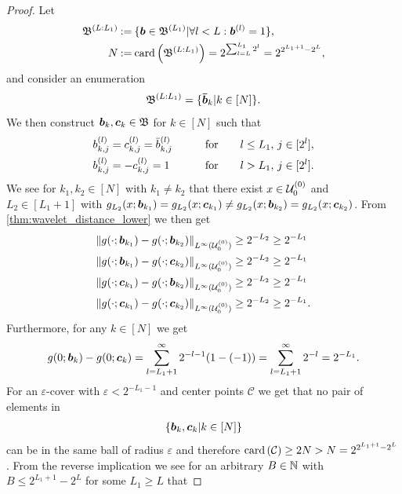 \documentclass[10pt,a4paper]{amsart}
\newcommand{\defeq}{\mathbin{:=}}
\newcommand{\set}[1]{\ensuremath{\mathcal{#1}}}
\begin{document}
\begin{proof}
Let
\begin{align}
    \CoeffSpace[L:L_1]
    &\defeq
    \{\coeff\in\CoeffSpace[L_1]|\forall l<L:\coeff[l]=1\},
    \\
    N
    &\defeq
    \card{\CoeffSpace[L:L_1]}=2^{\sum_{l=L}^{L_1}2^l}=2^{2^{L_1+1}-2^L},
\end{align}
and consider an enumeration
\begin{align}
    \CoeffSpace[L:L_1]=\{\coeff*_k|k\in[N]\}.
\end{align}
We then construct $\coeff_k,\coeffC_k\in\CoeffSpace$ for $k\in[N]$ such that
\begin{alignat}{2}
    \coeff[l][k,j]&=\coeffC[l][k,j]=\coeff*[l][k,j]&\qquad&\text{for}\qquad l\leq L_1,\, j\in[2^l],\\
    \coeff[l][k,j]&=-\coeffC[l][k,j]=1&&\text{for}\qquad l>L_1,\,j\in[2^l].
\end{alignat}
We see for $k_1,k_2\in[N]$ with $k_1\neq k_2$ that there exist $x\in\dyadicU{0}{0}$ and $L_2\in[L_1+1]$ with $g_{L_2}(x;\coeff_{k_1})=g_{L_2}(x;\coeffC_{k_1})\neq g_{L_2}(x;\coeff_{k_2})=g_{L_2}(x;\coeffC_{k_2})$.
From \cref{thm:wavelet_distance_lower} we then get
\begin{align}
    \norm{g(\cdot;\coeff_{k_1})-g(\cdot;\coeff_{k_2})}[L^\infty(\dyadicU{0}{0})]
    &\geq 2^{-L_2}\geq 2^{-L_1}
    \\
    \norm{g(\cdot;\coeff_{k_1})-g(\cdot;\coeffC_{k_2})}[L^\infty(\dyadicU{0}{0})]
    &\geq 2^{-L_2}\geq 2^{-L_1}
    \\
    \norm{g(\cdot;\coeffC_{k_1})-g(\cdot;\coeff_{k_2})}[L^\infty(\dyadicU{0}{0})]
    &\geq 2^{-L_2}\geq 2^{-L_1}
    \\
    \norm{g(\cdot;\coeffC_{k_1})-g(\cdot;\coeffC_{k_2})}[L^\infty(\dyadicU{0}{0})]
    &\geq 2^{-L_2}\geq 2^{-L_1}.
\end{align}
Furthermore, for any $k\in[N]$ we get
\begin{align}
    g(0;\coeff_k)-g(0;\coeffC_k)
    =
    \sum_{l=L_1+1}^\infty 2^{-l-1}(1-(-1))
    =
    \sum_{l=L_1+1}^\infty 2^{-l}
    =2^{-L_1}.
\end{align}
For an $\varepsilon$-cover with $\varepsilon<2^{-L_1-1}$ and center points $\set{C}$ we get that no pair of elements in
\begin{align}
    \{\coeff_k,\coeffC_k|k\in[N]\}
\end{align}
can be in the same ball of radius $\varepsilon$ and therefore $\card{\set{C}}\geq 2N>N=2^{2^{L_1+1}-2^{L}}$.
From the reverse implication we see for an arbitrary $B\in\nn$ with $B\leq 2^{L_1+1}-2^{L}$ for some $L_1\geq L$ that 

\end{proof}
\end{document}
